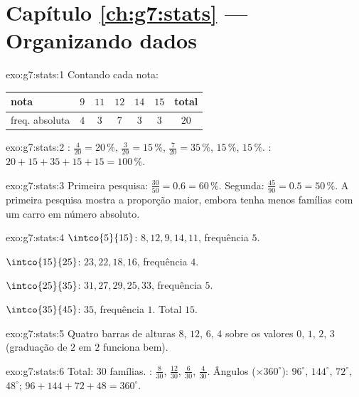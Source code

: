 \section*{Capítulo \ref{ch:g7:stats} --- Organizando dados}

\begin{solution}{exo:g7:stats:1}
Contando cada nota:
\begin{center}
\renewcommand{\arraystretch}{1.2}
\begin{tabular}{l|ccccc|c}
nota & $9$ & $11$ & $12$ & $14$ & $15$ & total \\
\hline
freq. absoluta & $4$ & $3$ & $7$ & $3$ & $3$ & $20$ \\
\end{tabular}
\end{center}
\end{solution}

\begin{solution}{exo:g7:stats:2}
: $\frac{4}{20} = 20\,\%$,
$\frac{3}{20} = 15\,\%$, $\frac{7}{20} = 35\,\%$, $15\,\%$, $15\,\%$.
: $20 + 15 + 35 + 15 + 15 = 100\,\%$. \checkmark
\end{solution}

\begin{solution}{exo:g7:stats:3}
Primeira pesquisa: $\frac{30}{50} = 0.6 = 60\,\%$. Segunda:
$\frac{45}{90} = 0.5 = 50\,\%$. A primeira pesquisa mostra a proporção
maior, embora tenha menos famílias com um carro em número absoluto.
\end{solution}

\begin{solution}{exo:g7:stats:4}
$\intco{5}{15}$: $8, 12, 9, 14, 11$, frequência $5$.

$\intco{15}{25}$: $23, 22, 18, 16$, frequência $4$.

$\intco{25}{35}$: $31, 27, 29, 25, 33$, frequência $5$.

$\intco{35}{45}$: $35$, frequência $1$. Total $15$. \checkmark
\end{solution}

\begin{solution}{exo:g7:stats:5}
Quatro barras de alturas $8$, $12$, $6$, $4$ sobre os valores $0$, $1$,
$2$, $3$ (graduação de $2$ em $2$ funciona bem).
\end{solution}

\begin{solution}{exo:g7:stats:6}
Total: $30$ famílias. : $\frac{8}{30}$,
$\frac{12}{30}$, $\frac{6}{30}$, $\frac{4}{30}$. Ângulos
($\times 360^\circ$): $96^\circ$, $144^\circ$, $72^\circ$, $48^\circ$;
 $96 + 144 + 72 + 48 = 360^\circ$. \checkmark
\end{solution}

